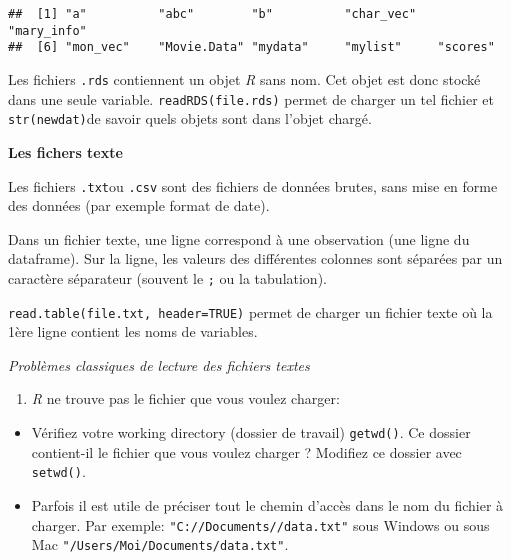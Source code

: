 \documentclass[]{book}
\providecommand{\tightlist}{%
  \setlength{\itemsep}{0pt}\setlength{\parskip}{0pt}}
\begin{document}
\begin{verbatim}
##  [1] "a"          "abc"        "b"          "char_vec"   "mary_info" 
##  [6] "mon_vec"    "Movie.Data" "mydata"     "mylist"     "scores"
\end{verbatim}

Les fichiers \texttt{.rds} contiennent un objet \emph{R} sans nom. Cet objet est donc stocké dans une seule variable. \texttt{readRDS(\textquotesingle{}file.rds\textquotesingle{})} permet de charger un tel fichier et \texttt{str(newdat)}de savoir quels objets sont dans l'objet chargé.

\textbf{Les fichers texte}

Les fichiers \texttt{.txt}ou \texttt{.csv} sont des fichiers de données brutes, sans mise en forme des données (par exemple format de date).

Dans un fichier texte, une ligne correspond à une observation (une ligne du dataframe). Sur la ligne, les valeurs des différentes colonnes sont séparées par un caractère séparateur (souvent le \texttt{;} ou la tabulation).

\texttt{read.table(\textquotesingle{}file.txt\textquotesingle{},\ header=TRUE)} permet de charger un fichier texte où la 1ère ligne contient les noms de variables.

\emph{Problèmes classiques de lecture des fichiers textes}

\begin{enumerate}
\def\labelenumi{\arabic{enumi}.}
\tightlist
\item
  \emph{R} ne trouve pas le fichier que vous voulez charger:
\end{enumerate}

\begin{itemize}
\tightlist
\item
  Vérifiez votre working directory (dossier de travail) \texttt{getwd()}. Ce dossier contient-il le fichier que vous voulez charger ? Modifiez ce dossier avec \texttt{setwd()}.\\
\item
  Parfois il est utile de préciser tout le chemin d'accès dans le nom du fichier à charger. Par exemple: \texttt{"C://Documents//data.txt"} sous Windows ou sous Mac \texttt{"/Users/Moi/Documents/data.txt"}.
\end{itemize}
\end{document}
